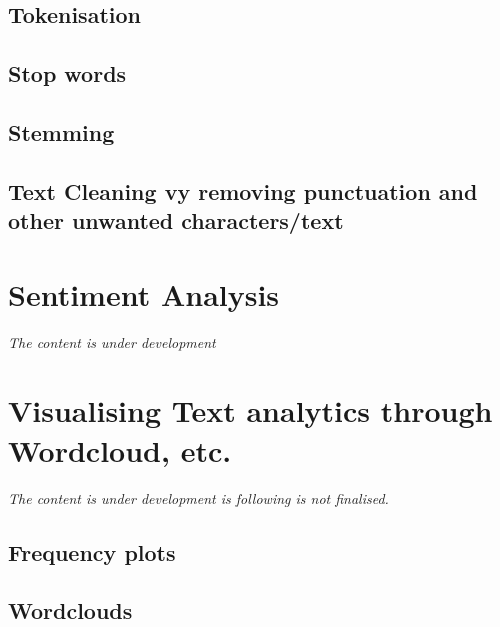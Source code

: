 \documentclass[
]{book}
\begin{document}
\hypertarget{tokenisation}{%
\section{Tokenisation}\label{tokenisation}}

\hypertarget{stop-words}{%
\section{Stop words}\label{stop-words}}

\hypertarget{stemming}{%
\section{Stemming}\label{stemming}}

\hypertarget{text-cleaning-vy-removing-punctuation-and-other-unwanted-characterstext}{%
\section{Text Cleaning vy removing punctuation and other unwanted characters/text}\label{text-cleaning-vy-removing-punctuation-and-other-unwanted-characterstext}}

\hypertarget{sentiment-analysis}{%
\chapter{Sentiment Analysis}\label{sentiment-analysis}}

\emph{The content is under development}

\hypertarget{visualising-text-analytics-through-wordcloud-etc.}{%
\chapter{Visualising Text analytics through Wordcloud, etc.}\label{visualising-text-analytics-through-wordcloud-etc.}}

\emph{The content is under development is following is not finalised.}

\hypertarget{frequency-plots}{%
\section{Frequency plots}\label{frequency-plots}}

\hypertarget{wordclouds}{%
\section{Wordclouds}\label{wordclouds}}
\end{document}
